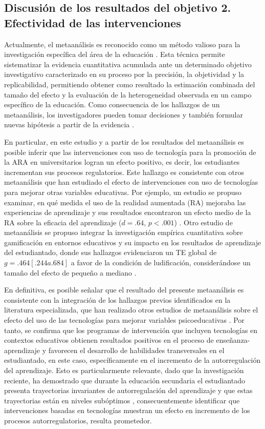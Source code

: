 \documentclass[spanish]{textolivre}
\begin{document}
\subsection{Discusión de los resultados del objetivo 2. Efectividad de las intervenciones}

 Actualmente, el metaanálisis es reconocido como un método valioso para la investigación específica del área de la educación \cite{bernardo2017meta}. Esta técnica permite sistematizar la evidencia cuantitativa acumulada ante un determinado objetivo investigativo caracterizado en su proceso por la precisión, la objetividad y la replicabilidad, permitiendo obtener como resultado la estimación combinada del tamaño del efecto y la evaluación de la heterogeneidad observada en un campo específico de la educación. Como consecuencia de los hallazgos de un metaanálisis, los investigadores pueden tomar decisiones y también formular nuevas hipótesis a partir de la evidencia \cite{moher2015preferred}. 

En particular, en este estudio y a partir de los resultados del metaanálisis es posible inferir que las intervenciones con uso de tecnología para la promoción de la ARA en universitarios logran un efecto positivo, es decir, los estudiantes incrementan sus procesos regulatorios. Este hallazgo es consistente con otros metaanálisis que han estudiado el efecto de intervenciones con uso de tecnologías para mejorar otras variables educativas. Por ejemplo, un estudio se propuso examinar, en qué medida el uso de la realidad aumentada (RA) mejoraba las experiencias de aprendizaje y sus resultados encontraron un efecto medio de la RA sobre la eficacia del aprendizaje ($d = .64$, $p < .001$) \cite{garzon2019systematic}. Otro estudio de metaanálisis se propuso integrar la investigación empírica cuantitativa sobre gamificación en entornos educativos y su impacto en los resultados de aprendizaje del estudiantado, donde sus hallazgos evidenciaron un TE global de $g = .464 [.244 a .684]$ a favor de la condición de ludificación, considerándose un tamaño del efecto de pequeño a mediano \cite{huang_impact_2020}.

En definitiva, es posible señalar que el resultado del presente metaanálisis es consistente con la integración de los hallazgos previos identificados en la literatura especializada, que han realizado otros estudios de metaanálisis sobre el efecto del uso de las tecnologías para mejorar variables psicoeducativas \cite{palomares2012inadequate, rojas2022analysis}. Por tanto, se confirma que los programas de intervención que incluyen tecnologías en contextos educativos obtienen resultados positivos en el proceso de enseñanza-aprendizaje y favorecen el desarrollo de habilidades transversales en el estudiantado, en este caso, específicamente en el incremento de la autorregulación del aprendizaje. Esto es particularmente relevante, dado que la investigación reciente, ha demostrado que durante la educación secundaria el estudiantado presenta trayectorias invariantes de autorregulación del aprendizaje y que estas trayectorias están en niveles subóptimos \cite{saez2023invariant}, consecuentemente identificar que intervenciones basadas en tecnologías muestran un efecto en incremento de los procesos autorregulatorios, resulta prometedor. 
\end{document}
